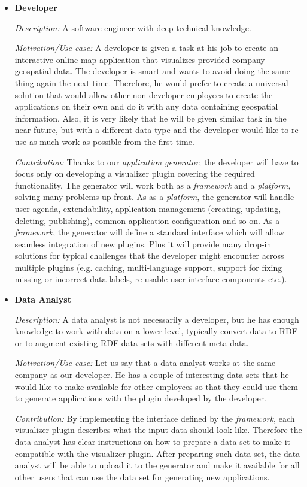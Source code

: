 \begin{itemize}
\item \textbf{Developer}

\textit{Description:} A software engineer with deep technical knowledge.

\textit{Motivation/Use case:} A developer is given a task at his job to create an interactive online map application that visualizes provided company geospatial data. The developer is smart and wants to avoid doing the same thing again the next time. Therefore, he would prefer to create a universal solution that would allow other non-developer employees to create the applications on their own and do it with any data containing geospatial information. Also, it is very likely that he will be given similar task in the near future, but with a different data type and the developer would like to re-use as much work as possible from the first time.

\textit{Contribution:} Thanks to our \emph{application generator}, the developer will have to focus only on developing a visualizer plugin covering the required functionality. The generator will work both as a \emph{framework} and a \emph{platform}, solving many problems up front. As as a \emph{platform}, the generator will handle user agenda, extendability, application management (creating, updating, deleting, publishing), common application configuration and so on. As a \emph{framework}, the generator will define a standard  interface which will allow seamless integration of new plugins. Plus it will provide many drop-in solutions for typical challenges that the developer might encounter across multiple plugins (e.g. caching, multi-language support, support for fixing missing or incorrect data labels, re-usable user interface components etc.).

\item \textbf{Data Analyst}

\textit{Description:} A data analyst is not necessarily a developer, but he has enough knowledge to work with data on a lower level, typically convert data to RDF or to augment existing RDF data sets with different meta-data. 

\textit{Motivation/Use case:} Let us say that a data analyst works at the same company as our developer. He has a couple of interesting data sets that he would like to make available for other employees so that they could use them to generate applications with the plugin developed by the developer.

\textit{Contribution:} By implementing the interface defined by the \emph{framework}, each visualizer plugin describes what the input data should look like. Therefore the data analyst has clear instructions on how to prepare a data set to make it compatible with the visualizer plugin. After preparing such data set, the data analyst will be able to upload it to the generator and make it available for all other users that can use the data set for generating new applications.


\end{itemize}
